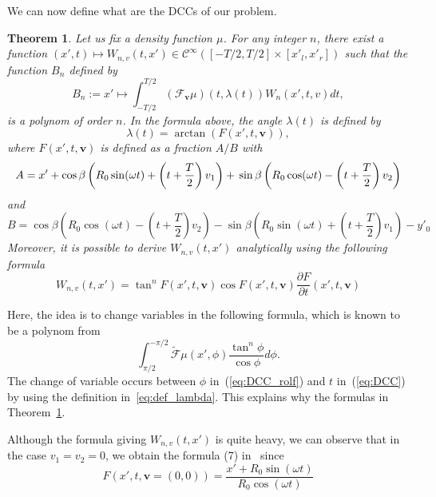 \documentclass[twocolumn]{IEEEtran}
\numberwithin{equation}{section}
\newcommand{\Cinf}{\mathcal{C}^{\infty}}
\newcommand{\bv}{\mathbf{v}}
\newcommand{\Tbv}{\mathcal{F}_{\mathbf{v}}}
\newtheorem{theorem}{Theorem}
\begin{document}
We can now define what are the DCCs of our problem.
\begin{theorem}
\label{theo:main}
Let us fix a density function $\mu$. For any integer $n$, there exist a function $(x',t)\mapsto W_{n,v}(t,x') \in \Cinf \left( [-T/2,T/2] \times [x'_l,x'_r] \right)$ such that the function $B_n$ defined by
\begin{equation}
	B_n := x' \mapsto \int_{-T/2}^{T/2} \left( \Tbv \mu \right)\left( t,\lambda(t) \right) W_n(x',t,v) dt,
\label{eq:DCC}
\end{equation}
is a polynom of order $n$. In the formula above, the angle $\lambda(t)$ is defined by
\begin{equation}
	\lambda(t) = \arctan \left( F(x',t,\bv) \right),
\label{eq:def_lambda}
\end{equation}
where $F(x',t,\bv)$ is defined as a fraction $A/B$ with
\begin{dmath}
	A = x' + \cos \beta \left( R_0 \sin(\omega t) + \left( t + \frac{T}{2} \right)v_1 \right) + \\
	\sin \beta \left( R_0 \cos(\omega t) - \left( t + \frac{T}{2} \right)v_2 \right)
\end{dmath}
and
\begin{dmath}
	B = \cos \beta \left( R_0 \cos(\omega t) - \left( t + \frac{T}{2} \right)v_2 \right) - \sin \beta \left( R_0 \sin(\omega t) + \left( t + \frac{T}{2} \right)v_1 \right) - y'_0 
\end{dmath}
Moreover, it is possible to derive $W_{n,v}(t,x')$ analytically using the following formula
\begin{equation}
	W_{n,v}(t,x') = \tan^n F(x',t,\bv) \cos F(x',t,\bv) \frac{\partial F}{\partial t} (x',t,\bv)
\end{equation}
\end{theorem}

Here, the idea is to change variables in the following formula, which is known to be a polynom from~\cite{clackdoyle2013necessary}
\begin{equation}
	\int_{\pi/2}^{-\pi/2} \tilde{\mathcal{F}}\mu (x',\phi) \frac{\tan^n \phi}{\cos \phi} d\phi.
\label{eq:DCC_rolf}
\end{equation}
The change of variable occurs between $\phi$ in~(\ref{eq:DCC_rolf}) and $t$ in~(\ref{eq:DCC}) by using the definition in~\ref{eq:def_lambda}. This explains why the formulas in Theorem~\ref{theo:main}.

Although the formula giving $W_{n,v}(t,x')$ is quite heavy, we can observe that in the case $v_1=v_2=0$, we obtain the formula (7) in~\cite{clackdoyle2015consistency} since
\begin{equation}
	F \left( x',t,\bv = (0,0) \right) = \frac{x' + R_0 \sin(\omega t)}{R_0 \cos(\omega t)}
\end{equation}
\end{document}
